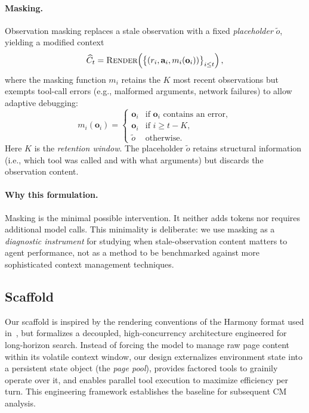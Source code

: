 \paragraph{Masking.}
Observation masking replaces a stale observation with a fixed \emph{placeholder} $\tilde{o}$, yielding a modified context
%
\begin{equation}
\label{eq:mask}
\widehat{C}_t = \textsc{Render}\!\left(\big\{(r_i, \mathbf{a}_i, m_i(\mathbf{o}_i))\big\}_{i \leq t}\right),
\end{equation}
%
where the masking function $m_i$ retains the $K$ most recent observations but exempts tool-call errors (e.g., malformed arguments, network failures) to allow adaptive debugging:
%
\begin{equation}
\label{eq:mask-fn}
m_i(\mathbf{o}_i) =
\begin{cases}
\mathbf{o}_i & \text{if } \mathbf{o}_i \text{ contains an error}, \\
\mathbf{o}_i & \text{if } i \geq t - K, \\
\tilde{o} & \text{otherwise}.
\end{cases}
\end{equation}
%
Here $K$ is the \emph{retention window}. The placeholder $\tilde{o}$ retains structural information (i.e., which tool was called and with what arguments) but discards the observation content.

\paragraph{Why this formulation.}
Masking is the minimal possible intervention. It neither adds tokens nor requires additional model calls. This minimality is deliberate: we use masking as a \emph{diagnostic instrument} for studying when stale-observation content matters to agent performance, not as a method to be benchmarked against more sophisticated context management techniques.


\subsection{Scaffold}
\label{sec:scaffold}

Our scaffold is inspired by the rendering conventions of the Harmony format used in~\citep{agarwal2025gptoss}, but formalizes a decoupled, high-concurrency architecture engineered for long-horizon search. Instead of forcing the model to manage raw page content within its volatile context window, our design externalizes environment state into a persistent state object (the \emph{page pool}), provides factored tools to grainily operate over it, and enables parallel tool execution to maximize efficiency per turn. This engineering framework establishes the baseline for subsequent CM analysis.

